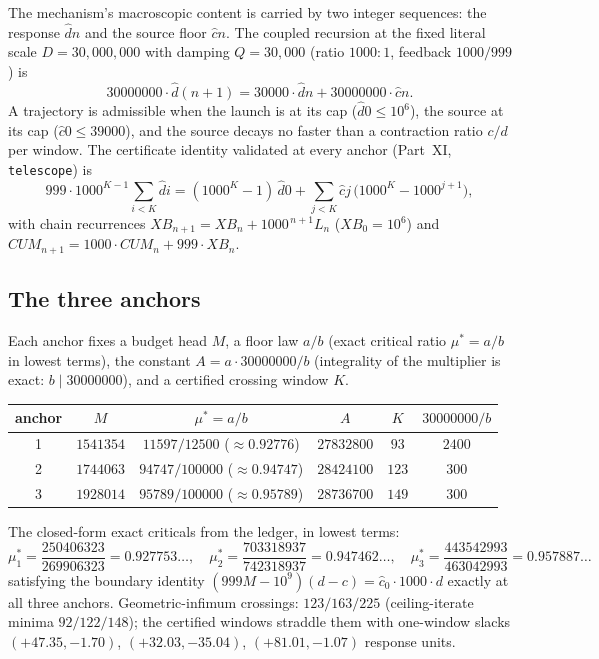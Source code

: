 \documentclass[11pt]{article}
\newcommand{\dhat}{\widehat{d}}
\newcommand{\chat}{\widehat{c}}
\begin{document}
The mechanism's macroscopic content is carried by two integer sequences: the response
$\dhat n$ and the source floor $\chat n$. The coupled recursion at the fixed literal scale
$D=30{,}000{,}000$ with damping $Q=30{,}000$ (ratio $1000:1$, feedback $1000/999$) is
\begin{equation}\label{eq:coupling}
30000000\cdot \dhat(n+1)=30000\cdot \dhat n+30000000\cdot \chat n .
\end{equation}
A trajectory is admissible when the launch is at its cap ($\dhat 0\le 10^6$), the source at
its cap ($\chat 0\le 39000$), and the source decays no faster than a contraction ratio
$c/d$ per window. The certificate identity validated at every anchor (Part~XI,
\texttt{telescope}) is
\begin{equation}\label{eq:telescope}
999\cdot 1000^{K-1}\sum_{i<K}\dhat i
=(1000^{K}-1)\,\dhat 0+\sum_{j<K}\chat j\,\bigl(1000^{K}-1000^{j+1}\bigr),
\end{equation}
with chain recurrences $XB_{n+1}=XB_n+1000^{\,n+1}L_n$ ($XB_0=10^6$) and
$CUM_{n+1}=1000\cdot CUM_n+999\cdot XB_n$.

\subsection{The three anchors}\label{sec:anchors}

Each anchor fixes a budget head $M$, a floor law $a/b$ (exact critical ratio $\mu^\ast=a/b$
in lowest terms), the constant $A=a\cdot 30000000/b$ (integrality of the multiplier is
exact: $b\mid 30000000$), and a certified crossing window $K$.

\begin{center}
\begin{tabular}{c c c c c c}
\hline
\textbf{anchor} & $M$ & $\mu^\ast=a/b$ & $A$ & $K$ & $30000000/b$\\
\hline
1 & $1541354$ & $11597/12500$ ($\approx 0.92776$) & $27832800$ & $93$ & $2400$\\
2 & $1744063$ & $94747/100000$ ($\approx 0.94747$) & $28424100$ & $123$ & $300$\\
3 & $1928014$ & $95789/100000$ ($\approx 0.95789$) & $28736700$ & $149$ & $300$\\
\hline
\end{tabular}
\end{center}

The closed-form exact criticals from the ledger, in lowest terms:
\[
\mu^\ast_1=\frac{250406323}{269906323}=0.927753\ldots,\quad
\mu^\ast_2=\frac{703318937}{742318937}=0.947462\ldots,\quad
\mu^\ast_3=\frac{443542993}{463042993}=0.957887\ldots
\]
satisfying the boundary identity $(999M-10^9)(d-c)=\chat_0\cdot 1000\cdot d$ exactly at all
three anchors. Geometric-infimum crossings: $123/163/225$ (ceiling-iterate minima
$92/122/148$); the certified windows straddle them with one-window slacks
$(+47.35,-1.70)$, $(+32.03,-35.04)$, $(+81.01,-1.07)$ response units.
\end{document}
